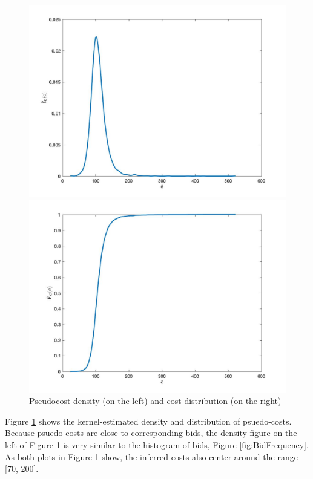 \documentclass[11pt]{article}
\begin{document}
\begin{figure}[h]
\centering
    \begin{minipage}[h]{0.5\textwidth}
        \centering
        \includegraphics[width=1\linewidth]{costDensity.jpg}
    \end{minipage}%
    \begin{minipage}[h]{0.5\textwidth}
        \centering
        \includegraphics[width=1\linewidth]{costDistribution.jpg}
    \end{minipage}
\caption{Pseudocost density (on the left) and cost distribution (on the right)}
\label{fig:CostEstimation}
\end{figure}

Figure \ref{fig:CostEstimation} shows the kernel-estimated density and 
distribution of psuedo-costs. Because psuedo-costs are close to corresponding 
bids, the density figure on the left of Figure \ref{fig:CostEstimation} is very 
similar to the histogram of bids, Figure \ref{fig:BidFrequency}. As both plots in 
Figure \ref{fig:CostEstimation} show, the inferred costs also center around 
the range [70, 200].
\end{document}
